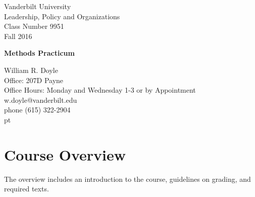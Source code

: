 \documentclass[12pt]{article}
\begin{document}


\thispagestyle{empty}%


\setlength{\parskip}{1ex plus 0.5ex minus 0.2ex}

\setcounter{secnumdepth}{-2}



\begin{flushleft}
Vanderbilt University\\Leadership, Policy and Organizations\\Class Number 9951\\ Fall 2016\\
\end{flushleft}

\begin{center}
\Large{\textbf{Methods Practicum}}\\
\end{center}

\begin{flushleft}
William R. Doyle\\
Office: 207D Payne\\
Office Hours: Monday and Wednesday 1-3 or by Appointment \\
w.doyle@vanderbilt.edu\\
phone (615) 322-2904\\

 pt

\end{flushleft}

\section{Course Overview}%

The overview includes an introduction to the course, guidelines on grading, and required texts.
\end{document}
